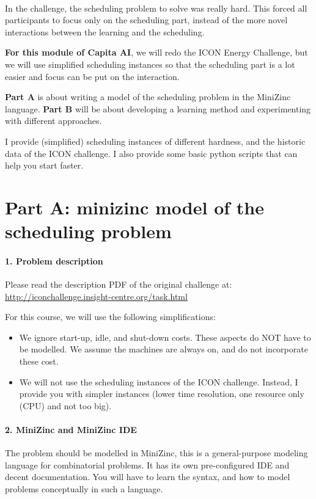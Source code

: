 \documentclass[a4,12pt]{article}
\begin{document}
\paragraph{}
In the challenge, the scheduling problem to solve was really hard. This forced all participants to focus only on the scheduling part, instead of the more novel interactions between the learning and the scheduling.

\textbf{For this module of Capita AI}, we will redo the ICON Energy Challenge, but we will use simplified scheduling instances so that the scheduling part is a lot easier and focus can be put on the interaction.

\textbf{Part A} is about writing a model of the scheduling problem in the MiniZinc language. \textbf{Part B} will be about developing a learning method and experimenting with different approaches.

I provide (simplified) scheduling instances of different hardness, and the historic data of the ICON challenge. I also provide some basic python scripts that can help you start faster.


\section{Part A: minizinc model of the scheduling problem}
\paragraph{1. Problem description}
Please read the description PDF of the original challenge at: \url{http://iconchallenge.insight-centre.org/task.html}

For this course, we will use the following simplifications:
\begin{itemize}
\item We ignore start-up, idle, and shut-down costs. These aspects do NOT have to be modelled. We assume the machines are always on, and do not incorporate these cost.
\item We will not use the scheduling instances of the ICON challenge. Instead, I provide you with simpler instances (lower time resolution, one resource only (CPU) and not too big).
\end{itemize}

\paragraph{2. MiniZinc and MiniZinc IDE}
The problem should be modelled in MiniZinc, this is a general-purpose modeling language for combinatorial problems. It has its own pre-configured IDE and decent documentation. You will have to learn the syntax, and how to model problems conceptually in such a language.
\end{document}
